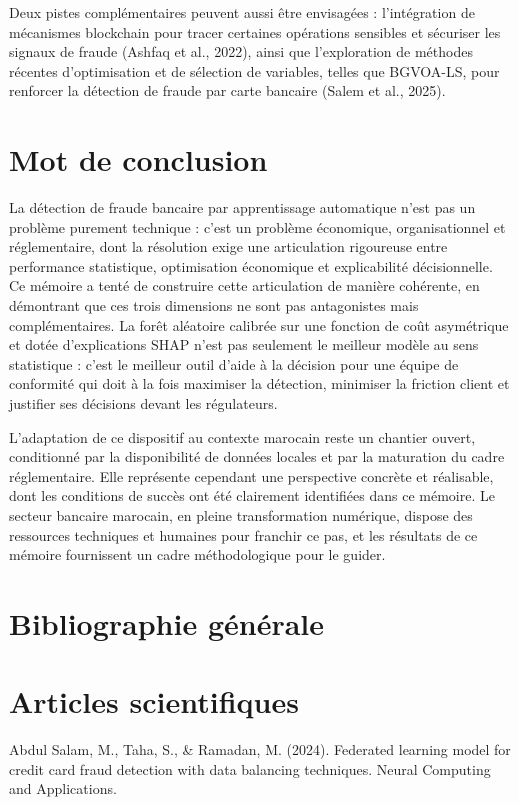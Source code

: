 Deux pistes complémentaires peuvent aussi être envisagées : l'intégration de mécanismes blockchain pour tracer certaines opérations sensibles et sécuriser les signaux de fraude (Ashfaq et al., 2022), ainsi que l'exploration de méthodes récentes d'optimisation et de sélection de variables, telles que BGVOA-LS, pour renforcer la détection de fraude par carte bancaire (Salem et al., 2025).

\section{Mot de conclusion}

La détection de fraude bancaire par apprentissage automatique n'est pas un problème purement technique : c'est un problème économique, organisationnel et réglementaire, dont la résolution exige une articulation rigoureuse entre performance statistique, optimisation économique et explicabilité décisionnelle. Ce mémoire a tenté de construire cette articulation de manière cohérente, en démontrant que ces trois dimensions ne sont pas antagonistes mais complémentaires. La forêt aléatoire calibrée sur une fonction de coût asymétrique et dotée d'explications SHAP n'est pas seulement le meilleur modèle au sens statistique : c'est le meilleur outil d'aide à la décision pour une équipe de conformité qui doit à la fois maximiser la détection, minimiser la friction client et justifier ses décisions devant les régulateurs.

L'adaptation de ce dispositif au contexte marocain reste un chantier ouvert, conditionné par la disponibilité de données locales et par la maturation du cadre réglementaire. Elle représente cependant une perspective concrète et réalisable, dont les conditions de succès ont été clairement identifiées dans ce mémoire. Le secteur bancaire marocain, en pleine transformation numérique, dispose des ressources techniques et humaines pour franchir ce pas, et les résultats de ce mémoire fournissent un cadre méthodologique pour le guider.

\section{Bibliographie générale}

\section{Articles scientifiques}

Abdul Salam, M., Taha, S., \& Ramadan, M. (2024). Federated learning model for credit card fraud detection with data balancing techniques. Neural Computing and Applications.


